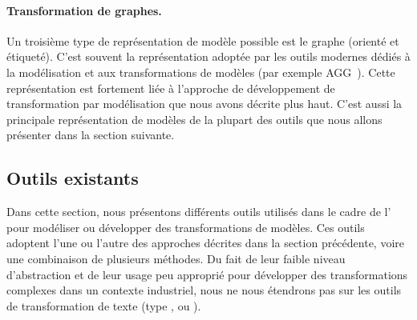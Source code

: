 \paragraph{Transformation de graphes.}
Un troisième type de représentation de modèle possible est le graphe (orienté
et étiqueté). C'est souvent la représentation adoptée par les outils modernes
dédiés à la modélisation et aux transformations de modèles (par exemple
AGG~\cite{Taentzer2004}). Cette représentation est fortement liée à l'approche
de développement de transformation par modélisation que nous avons décrite plus
haut. C'est aussi la principale représentation de modèles de la plupart des
outils que nous allons présenter dans la section suivante.

\subsection{Outils existants}
\label{ssec:outils}


Dans cette section, nous présentons différents outils utilisés dans le cadre de
l'{\idm} pour modéliser ou développer des transformations de modèles. Ces outils
adoptent l'une ou l'autre des approches décrites dans la section
précédente, voire une combinaison de plusieurs méthodes.
Du fait de leur faible niveau d'abstraction et de leur usage peu approprié pour
développer des transformations complexes dans un contexte industriel, nous ne
nous étendrons pas sur les outils de transformation de texte (type {\awk, \sed
ou \perl}).

